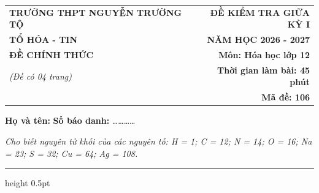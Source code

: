 \documentclass[11pt,a4paper]{article}
\begin{document}
\noindent
\begin{tabularx}{\textwidth}{@{}X r@{}}
\textbf{TRƯỜNG THPT NGUYỄN TRƯỜNG TỘ} & \textbf{ĐỀ KIỂM TRA GIỮA KỲ I} \\
\textbf{TỔ HÓA - TIN} & \textbf{NĂM HỌC 2026 - 2027} \\
\textbf{ĐỀ CHÍNH THỨC} & \textbf{Môn: Hóa học lớp 12} \\
\textit{(Đề có 04 trang)} & \textbf{Thời gian làm bài: 45 phút} \\
& \textbf{Mã đề: 106}
\end{tabularx}

\vspace{2pt}
\noindent\textbf{Họ và tên:} \dotfill \textbf{Số báo danh:} \dots\dots\dots\dots

\vspace{2pt}
\noindent\textit{Cho biết nguyên tử khối của các nguyên tố: H = 1; C = 12; N = 14; O = 16; Na = 23; S = 32; Cu = 64; Ag = 108.}
\vspace{2pt}
\hrule height 0.5pt
\vspace{6pt}

\vspace{4pt}
\end{document}
